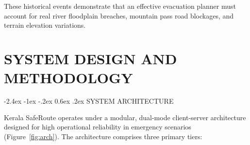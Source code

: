 \documentclass[12pt,oneside]{report}
\makeatletter
\renewcommand{\section}{\@startsection{section}{1}{\z@}%
  {-2.4ex \@plus -1ex \@minus -.2ex}%
  {0.6ex \@plus .2ex}%
  {\normalfont\large\bfseries}}
\newcommand{\chapterpage}[1]{\chapter{#1}}
\makeatother
\begin{document}
These historical events demonstrate that an effective evacuation planner must account for real river floodplain breaches, mountain pass road blockages, and terrain elevation variations.

\clearpage

\chapterpage{SYSTEM DESIGN AND METHODOLOGY}

\section{SYSTEM ARCHITECTURE}

Kerala SafeRoute operates under a modular, dual-mode client-server architecture designed for high operational reliability in emergency scenarios (Figure~\ref{fig:arch}). The architecture comprises three primary tiers:
\end{document}
